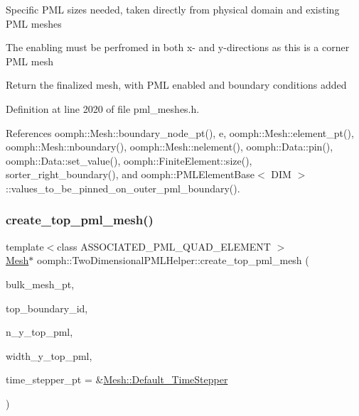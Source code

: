 Specific P\+ML sizes needed, taken directly from physical domain and existing P\+ML meshes

The enabling must be perfromed in both x-\/ and y-\/directions as this is a corner P\+ML mesh

Return the finalized mesh, with P\+ML enabled and boundary conditions added 

Definition at line 2020 of file pml\+\_\+meshes.\+h.



References oomph\+::\+Mesh\+::boundary\+\_\+node\+\_\+pt(), e, oomph\+::\+Mesh\+::element\+\_\+pt(), oomph\+::\+Mesh\+::nboundary(), oomph\+::\+Mesh\+::nelement(), oomph\+::\+Data\+::pin(), oomph\+::\+Data\+::set\+\_\+value(), oomph\+::\+Finite\+Element\+::size(), sorter\+\_\+right\+\_\+boundary(), and oomph\+::\+P\+M\+L\+Element\+Base$<$ D\+I\+M $>$\+::values\+\_\+to\+\_\+be\+\_\+pinned\+\_\+on\+\_\+outer\+\_\+pml\+\_\+boundary().

\mbox{\label{namespaceoomph_1_1TwoDimensionalPMLHelper_a5f19139e8145fb29caf9be94b1909ed1}} 
\subsubsection{\texorpdfstring{create\+\_\+top\+\_\+pml\+\_\+mesh()}{create\_top\_pml\_mesh()}}
{\footnotesize\ttfamily template$<$class A\+S\+S\+O\+C\+I\+A\+T\+E\+D\+\_\+\+P\+M\+L\+\_\+\+Q\+U\+A\+D\+\_\+\+E\+L\+E\+M\+E\+NT $>$ \\
\hyperlink{classoomph_1_1Mesh}{Mesh}$\ast$ oomph\+::\+Two\+Dimensional\+P\+M\+L\+Helper\+::create\+\_\+top\+\_\+pml\+\_\+mesh (\begin{DoxyParamCaption}\item[{\hyperlink{classoomph_1_1Mesh}{Mesh} $\ast$}]{bulk\+\_\+mesh\+\_\+pt,  }\item[{const unsigned \&}]{top\+\_\+boundary\+\_\+id,  }\item[{const unsigned \&}]{n\+\_\+y\+\_\+top\+\_\+pml,  }\item[{const double \&}]{width\+\_\+y\+\_\+top\+\_\+pml,  }\item[{\hyperlink{classoomph_1_1TimeStepper}{Time\+Stepper} $\ast$}]{time\+\_\+stepper\+\_\+pt = {\ttfamily \&\hyperlink{classoomph_1_1Mesh_a12243d0fee2b1fcee729ee5a4777ea10}{Mesh\+::\+Default\+\_\+\+Time\+Stepper}} }\end{DoxyParamCaption})}



